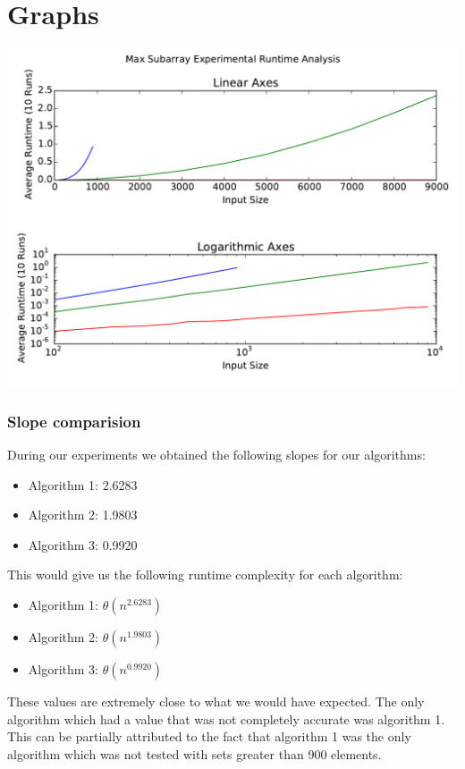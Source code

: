 \documentclass{article}
\begin{document}
\section{Graphs}

\includegraphics[width=\textwidth]{timings}

\subsubsection*{Slope comparision}

During our experiments we obtained the following slopes for our algorithms:

\begin{itemize}
\item Algorithm 1: 2.6283
\item Algorithm 2: 1.9803
\item Algorithm 3: 0.9920
\end{itemize}

This would give us the following runtime complexity for each algorithm:

\begin{itemize}
    \item Algorithm 1: $\mathcal{\theta}(n^{2.6283})$
    \item Algorithm 2: $\mathcal{\theta}(n^{1.9803})$
    \item Algorithm 3: $\mathcal{\theta}(n^{0.9920})$
\end{itemize}

These values are extremely close to what we would have expected. The only
algorithm which had a value that was not completely accurate was algorithm 1.
This can be partially attributed to the fact that algorithm 1 was the only
algorithm which was not tested with sets greater than 900 elements.
\end{document}
